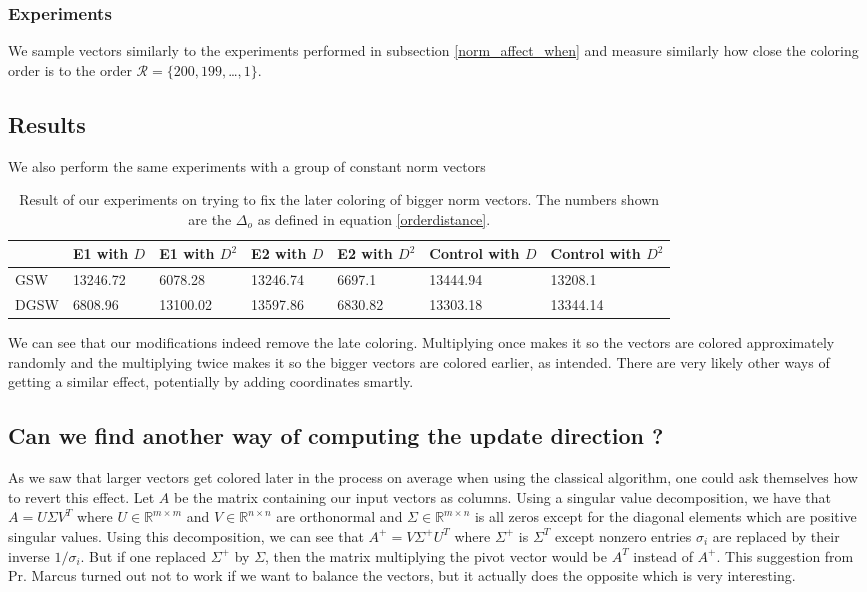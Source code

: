 \documentclass[12pt]{article}
\begin{document}
\subsubsection{Experiments}
We sample vectors similarly to the experiments performed in subsection \ref{norm_affect_when} and measure similarly how close the coloring order is to the order $\mathcal{R}=\{200,199,$\dots$,1\}$.
\subsection{Results}
We also perform the same experiments with a group of constant norm vectors
\begin{center}
\begin{table}[h]
\begin{tabular}{l|llllll}
 &E1 with $D$&E1 with $D^2$& E2 with $D$&E2 with $D^2$& Control with $D$&Control with $D^2$   \\
\hline
GSW&13246.72&6078.28&13246.74&6697.1&13444.94&13208.1\\
DGSW&6808.96&13100.02&13597.86&6830.82&13303.18&13344.14
\end{tabular}
\caption{Result of our experiments on trying to fix the later coloring of bigger norm vectors. The numbers shown are the $\Delta_o$ as defined in equation \ref{orderdistance}.}
\label{norm_earlier}
\end{table}
\end{center}
We can see that our modifications indeed remove the late coloring. Multiplying once makes it so the vectors are colored approximately randomly and the multiplying twice makes it so the bigger vectors are colored earlier, as intended. There are very likely other ways of getting a similar effect, potentially by adding coordinates smartly.

\subsection{Can we find another way of computing the update direction ?}
 As we saw that larger vectors get colored later in the process on average when using the classical algorithm, one could ask themselves how to revert this effect. Let $A$ be the matrix containing our input vectors as columns. Using a singular value decomposition, we have that $A=U\Sigma V^T$ where $U\in\mathbb{R}^{m\times m}$ and $V\in\mathbb{R}^{n\times n}$ are orthonormal and $\Sigma\in\mathbb{R}^{m\times n}$ is all zeros except for the diagonal elements which are positive singular values. Using this decomposition, we can see that $A^+=V\Sigma^+U^T$ where $\Sigma^+$ is $\Sigma^T$ except nonzero entries $\sigma_i$ are replaced by their inverse $1/\sigma_i$. But if one replaced $\Sigma^+$ by $\Sigma$, then the  matrix multiplying the pivot vector would be $A^T$ instead of $A^+$. This suggestion from Pr. Marcus turned out not to work if we want to balance the vectors, but it actually does the opposite which is very interesting. 
\end{document}
